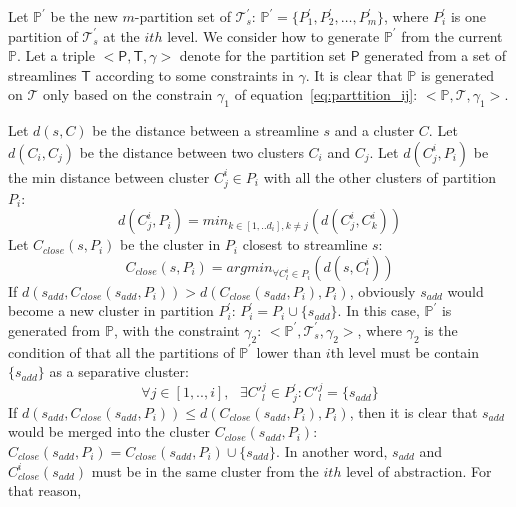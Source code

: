 Let $\mathbb{P}^{'}$ be the new $m$-partition set of $\mathcal{T}_{s}^{'}$: $\mathbb{P^{'}} = \{P_{1}^{'}, P_{2}^{'}, \ldots, P_{m}^{'}\}$, where $P_{i}^{'}$ is one partition of $\mathcal{T}_{s}^{'}$ at the $ith$ level. 
We consider how to generate $\mathbb{P}^{'}$ from the current $\mathbb{P}$.
Let a triple $<\mathsf{P}, \mathsf{T}, \gamma>$ denote for the partition set $\mathsf{P}$ generated from a set of streamlines $\mathsf{T}$ according to some constraints in $\gamma$. It is clear that $\mathbb{P}$ is generated on $\mathcal{T}$ only based on the constrain $\gamma_1$ of equation~\ref{eq:parttition_ij}: $<\mathbb{P}, \mathcal{T}, \gamma_1>$.

Let $d(s,C)$ be the distance between a streamline $s$ and a cluster $C$. Let $d(C_{i}, C_{j})$ be the distance between two clusters $C_i$ and $C_j$. Let $d(C_{j}^{i},P_{i})$ be the min distance between cluster $C_{j}^{i} \in P_{i}$ with all the other clusters of partition $P_{i}$: 
\begin{equation}
\label{eq:min_dis_cluster}
d(C_{j}^{i},P_{i}) = min_{k\in [1,..d_{i}], k \neq j}(d(C_{j}^{i},C_{k}^{i}))
\end{equation}
Let $C_{close}(s,P_i)$ be the cluster in $P_i$ closest to streamline $s$: 
\begin{equation}
\label{eq:closest_streamline_cluster}
C_{close}(s,P_{i}) = argmin_{\forall C_{l}^{i} \in P_{i}}(d(s,C_{l}^{i}))
\end{equation}
If $d(s_{add}, C_{close}(s_{add},P_{i})) > d(C_{close}(s_{add},P_{i}),P_{i})$, obviously $s_{add}$ would become a new cluster in partition $P_{i}^{'}$: $P_{i}^{'} = P_{i} \cup \{s_{add}\}$.
In this case, $\mathbb{P}^{'}$ is generated from $\mathbb{P}$, with the constraint $\gamma_2$: $<\mathbb{P}^{'}, \mathcal{T}_{s}^{'}, \gamma_2>$, where   $\gamma_2$ is the condition of that all the partitions of $\mathbb{P}^{'}$ lower than $i$th level must be contain $\{s_{add}\}$ as a separative cluster: 
\begin{equation}
\label{eq:separate_cluster}
	\forall j \in [1,..,i], \mbox{ } \exists {C'}_{l}^{j} \in P_{j}^{'}: {C'}_{l}^{j} = \{s_{add}\}
\end{equation}
If $d(s_{add}, C_{close}(s_{add},P_{i})) \leq d(C_{close}(s_{add},P_{i}),P_{i})$, then it is clear that $s_{add}$ would be merged into the cluster $C_{close}(s_{add},P_{i})$: $C_{close}(s_{add},P_{i}) = C_{close}(s_{add},P_{i}) \cup \{s_{add}\}$. In another word, $s_{add}$ and $C_{close}^{i}(s_{add})$ must be in the same cluster from the $ith$ level of abstraction.
For that reason, 
